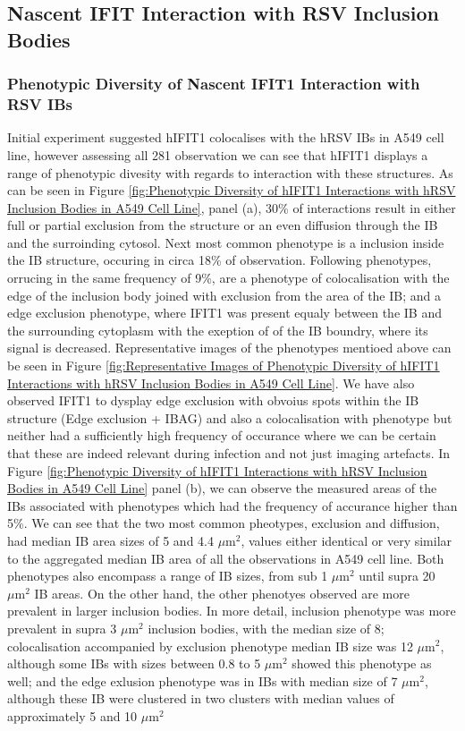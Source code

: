 \subsection{Nascent IFIT Interaction with RSV Inclusion Bodies} \label{subsec:Nascent IFIT Interaction with RSV Inclusion Bodies}
\subsubsection{Phenotypic Diversity of Nascent IFIT1 Interaction with RSV IBs}
Initial experiment suggested hIFIT1 colocalises with the hRSV IBs in A549 cell line, however assessing all 281 observation we can see that hIFIT1 displays a range of phenotypic divesity with regards to interaction with these structures. As can be seen in Figure \ref{fig:Phenotypic Diversity of hIFIT1 Interactions with hRSV Inclusion Bodies in A549 Cell Line}, panel (a), 30\% of interactions result in either full or partial exclusion from the structure or an even diffusion through the IB and the surroinding cytosol. Next most common phenotype is a inclusion inside the IB structure, occuring in circa 18\% of observation. Following phenotypes, orrucing in the same frequency of 9\%, are a phenotype of colocalisation with the edge of the inclusion body joined with exclusion from the area of the IB; and a edge exclusion phenotype, where IFIT1 was present equaly between the IB and the surrounding cytoplasm with the exeption of of the IB boundry, where its signal is decreased. Representative images of the phenotypes mentioed above can be seen in Figure \ref{fig:Representative Images of Phenotypic Diversity of hIFIT1 Interactions with hRSV Inclusion Bodies in A549 Cell Line}. We have also observed IFIT1 to dysplay edge exclusion with obvoius spots within the IB structure (Edge exclusion + IBAG) and also a colocalisation with phenotype but neither had a sufficiently high frequency of occurance where we can be certain that these are indeed relevant during infection and not just imaging artefacts. In Figure \ref{fig:Phenotypic Diversity of hIFIT1 Interactions with hRSV Inclusion Bodies in A549 Cell Line} panel (b), we can observe the measured areas of the IBs associated with phenotypes which had the frequency of accurance higher than 5\%. We can see that the two most common pheotypes, exclusion and diffusion, had median IB area sizes of 5 and 4.4 \(\mu \mbox{m}^2\), values either identical or very similar to the aggregated median IB area of all the observations in A549 cell line. Both phenotypes also encompass a range of IB sizes, from sub 1 \(\mu \mbox{m}^2\) until supra 20 \(\mu \mbox{m}^2\) IB areas. On the other hand, the other phenotyes observed are more prevalent in larger inclusion bodies. In more detail, inclusion phenotype was more prevalent in supra 3 \(\mu \mbox{m}^2\) inclusion bodies, with the median size of 8; colocalisation accompanied by exclusion phenotype median IB size was 12 \(\mu \mbox{m}^2\), although some IBs with sizes between 0.8 to 5 \(\mu \mbox{m}^2\) showed this phenotype as well; and the edge exlusion phenotype was in IBs with median size of 7 \(\mu \mbox{m}^2\), although these IB were clustered in two clusters with median values of approximately 5 and 10 \(\mu \mbox{m}^2\) 